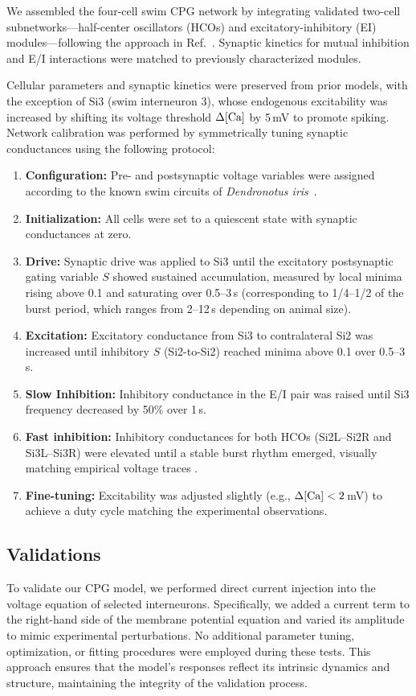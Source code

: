 \documentclass[nofootinbib,aip,amsmath,amssymb,reprint,twocolumn,10pt]{revtex4-2}
\begin{document}
We assembled the four-cell swim CPG network by integrating validated two-cell subnetworks---half-center oscillators (HCOs) and excitatory-inhibitory (EI) modules---following the approach in Ref.~\cite{scully2024pairing}. Synaptic kinetics for mutual inhibition and E/I interactions were matched to previously characterized modules.

Cellular parameters and synaptic kinetics were preserved from prior models, with the exception of Si3 (swim interneuron 3), whose endogenous excitability was increased by shifting its voltage threshold $\Delta [\rm Ca]$ by 5\,mV to promote spiking. Network calibration was performed by symmetrically tuning synaptic conductances using the following protocol:

\begin{enumerate}
  \item \textbf{Configuration:} Pre- and postsynaptic voltage variables were assigned according to the known swim circuits of \textit{Dendronotus iris}~\cite{SakuraiKatz2016}.
  \item \textbf{Initialization:} All cells were set to a quiescent state with synaptic conductances at zero.
  \item \textbf{Drive:} Synaptic drive was applied to Si3 until the excitatory postsynaptic gating variable $S$ showed sustained accumulation, measured by local minima rising above 0.1 and saturating over 0.5--3\,s (corresponding to 1/4--1/2 of the burst period, which ranges from 2--12\,s depending on animal size).
  \item \textbf{Excitation:} Excitatory conductance from Si3 to contralateral Si2 was increased until inhibitory $S$ (Si2-to-Si2) reached minima above 0.1 over 0.5--3\,s.
  \item \textbf{Slow Inhibition:} Inhibitory conductance in the E/I pair was raised until Si3 frequency decreased by 50\% over 1\,s.
  \item \textbf{Fast inhibition:} Inhibitory conductances for both HCOs (Si2L--Si2R and Si3L--Si3R) were elevated until a stable burst rhythm emerged, visually matching empirical voltage traces \cite{SakuraiKatz2016}.
  \item \textbf{Fine-tuning:} Excitability was adjusted slightly (e.g., $\Delta [\rm Ca] < 2$\,mV) to achieve a duty cycle matching the experimental observations.
\end{enumerate}

\subsection{Validations}
%
To validate our CPG model, we performed direct current injection into the voltage equation of selected interneurons. Specifically, we added a current term to the right-hand side of the membrane potential equation and varied its amplitude to mimic experimental perturbations. No additional parameter tuning, optimization, or fitting procedures were employed during these tests. This approach ensures that the model's responses reflect its intrinsic dynamics and structure, maintaining the integrity of the validation process.
\end{document}
